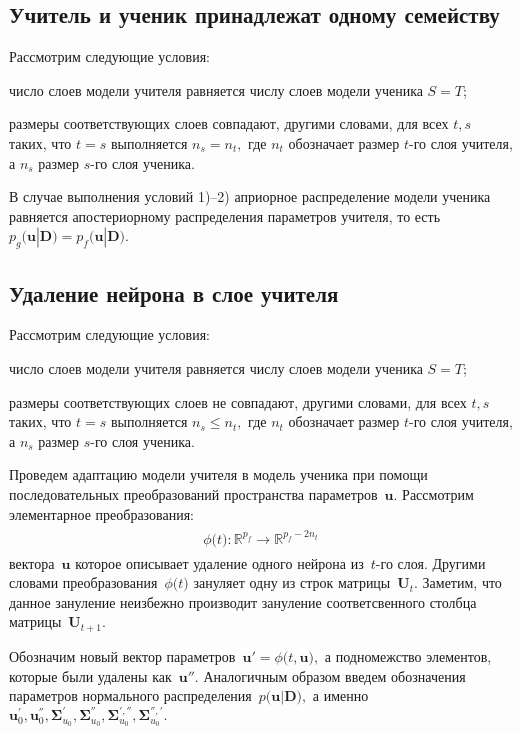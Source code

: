 \documentclass[12pt]{a&t}
\begin{document}
\subsection{Учитель и ученик принадлежат одному семейству}
Рассмотрим следующие условия:
\begin{enumlist}
    \item число слоев модели учителя равняется числу слоев модели ученика $S=T$;
    \item размеры соответствующих слоев совпадают, другими словами, для всех $t, s$ таких, что $t=s$ выполняется $n_s = n_t,$ где $n_t$ обозначает размер $t$-го слоя учителя, а $n_s$ размер $s$-го слоя ученика.
\end{enumlist}
В случае выполнения условий 1)--2) априорное распределение модели ученика равняется апостериорному распределения параметров учителя, то есть $p_g\bigr(\mathbf{u}|\mathbf{D}\bigr) = p_f\bigr(\mathbf{u}|\mathbf{D}\bigr)$.

\subsection{Удаление нейрона в слое учителя}
Рассмотрим следующие условия:
\begin{enumlist}
    \item число слоев модели учителя равняется числу слоев модели ученика $S=T$;
    \item размеры соответствующих слоев не совпадают, другими словами, для всех $t, s$ таких, что $t=s$ выполняется $n_s \leq n_t,$ где $n_t$ обозначает размер $t$-го слоя учителя, а $n_s$ размер $s$-го слоя ученика.
\end{enumlist}

Проведем адаптацию модели учителя в модель ученика при помощи последовательных преобразований пространства параметров~$\mathbf{u}$. Рассмотрим элементарное преобразования:
\begin{gather}
\label{eq:ap:2}
\begin{aligned}
\phi\bigr(t\bigr) : \mathbb{R}^{p_f} \to \mathbb{R}^{p_f-2n_t}
\end{aligned}
\end{gather}
вектора~$\mathbf{u}$ которое описывает удаление одного нейрона из~$t$-го слоя. Другими словами преобразования~$\phi\bigr(t\bigr)$ зануляет одну из строк матрицы~$\mathbf{U}_t$. Заметим, что данное зануление неизбежно производит зануление соответсвенного столбца матрицы~$\mathbf{U}_{t+1}$.

Обозначим новый вектор параметров~$\mathbf{u}' =  \phi\bigr(t, \mathbf{u}\bigr),$ а подномежство элементов, которые были удалены как~$\mathbf{u}''.$ Аналогичным образом введем обозначения параметров нормального распределения~$p\bigr(\mathbf{u}|\mathbf{D}\bigr),$ а именно $\mathbf{u}_0^{'}, \mathbf{u}_0^{''}, \bm{\Sigma}_{u_0}^{'}, \bm{\Sigma}_{u_0}^{''}, \bm{\Sigma}_{u_0}^{', ''}, \bm{\Sigma}_{u_0}^{'','}.$
\end{document}
